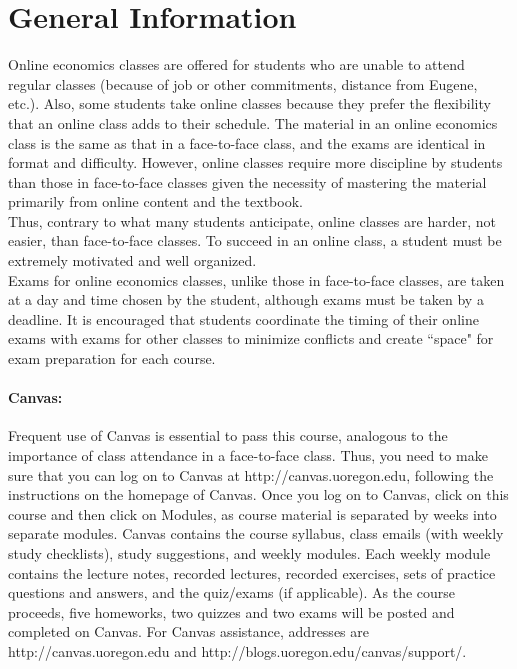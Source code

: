 \documentclass[10pt]{article}
\begin{document}
\section*{General Information}

\noindent Online economics classes are offered for students who are unable to attend regular classes (because of job or other commitments, distance from Eugene, etc.). 
Also, some students take online classes because they prefer the flexibility that an online class adds to their schedule.
The material in an online economics class is the same as that in a face-to-face class, and the exams are identical in format and difficulty.
However, online classes require more discipline by students than those in face-to-face classes given the necessity of mastering the material primarily from online content and the textbook. \\

\noindent Thus, contrary to what many students anticipate, online classes are harder, not easier, than face-to-face classes. 
To succeed in an online class, a student must be extremely motivated and well organized. \\  

\noindent Exams for online economics classes, unlike those in face-to-face classes, are taken at a day and time chosen by the student, although exams must be taken by a deadline.
It is encouraged that students coordinate the timing of their online exams with exams for other classes to minimize conflicts and create ``space" for exam preparation for each course. \\

\paragraph{Canvas:} Frequent use of Canvas is essential to pass this course, analogous to the importance of class attendance in a face-to-face class. 
Thus, you need to make sure that you can log on to Canvas at http://canvas.uoregon.edu, following the instructions on the homepage of Canvas. 
Once you log on to Canvas, click on this course and then click on Modules, as course material is separated by weeks into separate modules. 
Canvas contains the course syllabus, class emails (with weekly study checklists), study suggestions, and weekly modules.
Each weekly module contains the lecture notes, recorded lectures, recorded exercises, sets of practice questions and answers, and the quiz/exams (if applicable).  
As the course proceeds, five homeworks, two quizzes and two exams will be posted and completed on Canvas.  For Canvas assistance, addresses are http://canvas.uoregon.edu and http://blogs.uoregon.edu/canvas/support/. 
\end{document}
